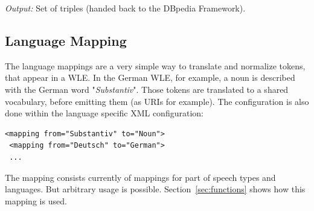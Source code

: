 \textit{Output:} Set of triples (handed back to the DBpedia Framework).

\subsection{Language Mapping}\label{sec:mapping}
The language mappings are a very simple way to translate and normalize tokens, that appear in a WLE. 
In the German WLE, for example, a noun is described with the German word "\textit{Substantiv}". 
Those tokens are translated to a shared vocabulary, before emitting them (as URIs for example). 
The configuration is also done within the language specific XML configuration:
\begin{lstlisting}[style=XML]
 <mapping from="Substantiv" to="Noun"> 
 <mapping from="Deutsch" to="German"> 
 ...
\end{lstlisting}
The mapping consists currently of mappings for part of speech types and languages. But arbitrary usage is possible. Section~\ref{sec:functions} shows how this mapping is used.

